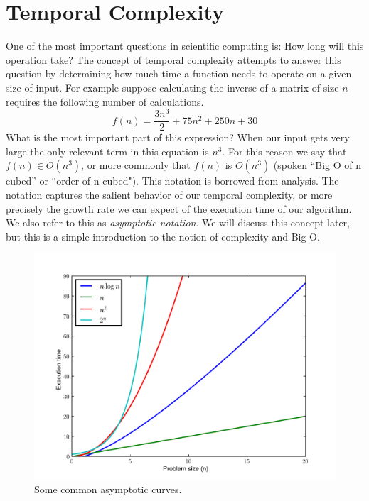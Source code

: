

\section*{Temporal Complexity}
One of the most important questions in scientific computing is:
How long will this operation take?
The concept of temporal complexity attempts to answer this question by determining
how much time a function needs to operate on a given size of input.
For example suppose calculating the inverse of a matrix of size $n$ requires the following number of calculations.
\begin{equation*}
f(n) = \frac{3n^3}{2} + 75n^2 + 250n + 30
\end{equation*}
What is the most important part of this expression?
When our input gets very large the only relevant term in this equation is $n^3$.
For this reason we say that $f(n) \in O(n^3)$, or more commonly that $f(n)$ is $O(n^3)$
(spoken ``Big O of n cubed'' or ``order of n cubed").
This notation is borrowed from analysis. The notation captures the salient behavior of our temporal complexity,
or more precisely the growth rate we can expect of the execution time of our algorithm.
We also refer to this as \emph{asymptotic notation}.
We will discuss this concept later, but this is a simple introduction to the notion of complexity and Big O.
\begin{figure}[h]
\centering
\includegraphics[width=\textwidth]{complexitycurves.pdf}
\caption{Some common asymptotic curves.}
\end{figure}


